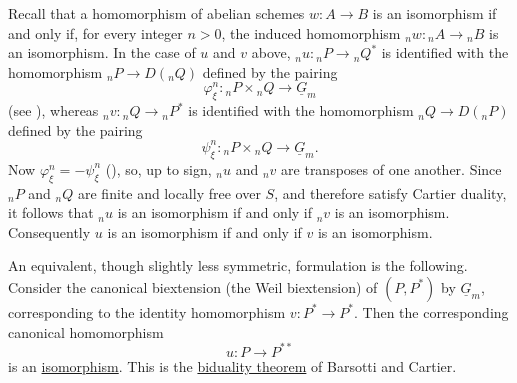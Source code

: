 Recall that a homomorphism of abelian schemes $w:A\longrightarrow B$
is an isomorphism if and only if, for every integer $n>0$, the induced
homomorphism ${}_nw:{}_nA\longrightarrow{}_nB$ is an isomorphism.  In
the case of $u$ and $v$ above, ${}_nu:{}_nP\longrightarrow{}_nQ^*$ is
identified with the homomorphism
${}_nP\longrightarrow D({}_nQ)$ defined by the pairing
\[
 \varphi_\xi^n:{}_nP\times{}_nQ\longrightarrow\underline G_m
\]
(see ), whereas ${}_nv:{}_nQ\longrightarrow{}_nP^*$ is
identified with the homomorphism
${}_nQ\longrightarrow D({}_nP)$ defined by the pairing
\[
 \psi_\xi^n:{}_nP\times{}_nQ\longrightarrow\underline G_m.
\]
Now $\varphi_\xi^n=-\psi_\xi^n$ (), so, up to sign,
${}_nu$ and ${}_nv$ are transposes of one another.  Since ${}_nP$ and
${}_nQ$ are finite and locally free over $S$, and therefore satisfy
Cartier duality, it follows that ${}_nu$ is an isomorphism if and only
if ${}_nv$ is an isomorphism.  Consequently $u$ is an isomorphism if
and only if $v$ is an isomorphism.

An equivalent, though slightly less symmetric, formulation is the
following.  Consider the canonical biextension (the Weil
biextension) of $(P,P^*)$ by $\underline G_m$, corresponding to the
identity homomorphism $v:P^*\longrightarrow P^*$.  Then the
corresponding canonical homomorphism
\[
 u:P\longrightarrow P^{**}
\]
is an \underline{isomorphism}.  This is the \underline{biduality
theorem} of Barsotti and Cartier.

